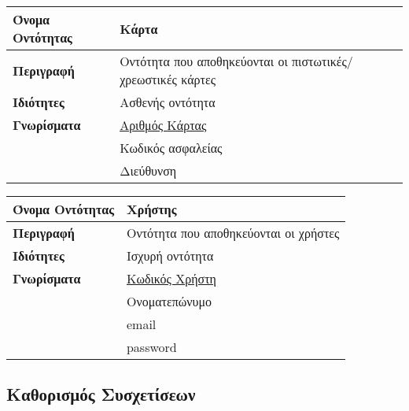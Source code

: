 \begin{center}
\begin{tabular}[]{|p{4cm}|p{10cm}|}
\hline
\textbf{Όνομα Οντότητας}   &  Κάρτα \\ \hline 
\textbf{Περιγραφή}         &  Οντότητα που αποθηκεύονται οι πιστωτικές/χρεωστικές κάρτες \\ \hline 
\textbf{Ιδιότητες}         &  Ασθενής οντότητα \\  \hline                 
\textbf{Γνωρίσματα}        &  \underline{Αριθμός Κάρτας} \\
            ~              &  Κωδικός ασφαλείας \\
             ~             &  Διεύθυνση \\
\hline
\end{tabular}
\begin{tabular}[]{|p{4cm}|p{10cm}|}\\ \hline
\textbf{Όνομα Οντότητας}   &  Χρήστης\\ \hline 
\textbf{Περιγραφή}         &  Οντότητα που αποθηκεύονται οι χρήστες\\ \hline 
\textbf{Ιδιότητες}         &  Ισχυρή οντότητα \\  \hline                 
\textbf{Γνωρίσματα}        &  \underline{Κωδικός Χρήστη} \\
            ~              &  Ονοματεπώνυμο \\
                           &  email \\
                           &  password \\
\hline
\end{tabular}
\vspace{0.3 cm}

\end{center}
\subsection{Καθορισμός Συσχετίσεων}

